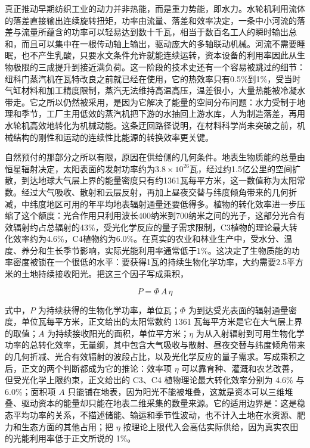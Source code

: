 真正推动早期纺织工业的动力并非热能，而是重力势能，即水力。水轮机利用流体的落差直接输出连续旋转扭矩，功率由流量、落差和效率决定，一条中小河流的落差与流量所蕴含的功率可以轻易达到数十千瓦，相当于数百名工人的瞬时输出总和，而且可以集中在一根传动轴上输出，驱动庞大的多轴联动机械。河流不需要睡眠，也不产生乳酸，只要水文条件允许就能连续运转，资本设备的利用率因此从生物极限的三成提升到接近满负荷。这一阶段的技术史还有一个容易被跳过的细节：纽科门蒸汽机在瓦特改良之前就已经在使用，它的热效率只有0.5\%到1\%，受当时气缸材料和加工精度限制，蒸汽无法维持高温高压，温差很小，大量热能被冷凝水带走。它之所以仍然被采用，是因为它解决了能量的空间分布问题：水力受制于地理和季节，工厂主用低效的蒸汽机把下游的水抽回上游水库，人为制造落差，再用水轮机高效地转化为机械动能。这条迂回路径说明，在材料科学尚未突破之前，机械结构的刚性和运动的连续性比能源的转换效率更关键。


自然预付的那部分之所以有限，原因在供给侧的几何条件。地表生物质能的总量由恒星辐射决定，太阳表面的发射功率约为$3.8\times10^{26}$瓦，经过约1.5亿公里的空间扩散，到达地球大气层上界的能量密度只有约1361瓦每平方米，这一数值称为太阳常数。\cite{prsa2016nominal}经过大气吸收、散射和云层反射，再加上昼夜交替与纬度倾角带来的几何折减，中纬度地区可用的年平均地表辐射通量还要低得多。植物的转化效率进一步压缩了这个额度：光合作用只利用波长400纳米到700纳米之间的光子，这部分光合有效辐射约占总辐射的43\%，受光化学反应的量子需求限制，C3植物的理论最大转化效率约为4.6\%，C4植物约为6.0\%。\cite{zhu2008what}在真实的农业和林业生产中，受水分、温度、养分和生长季节影响，实际光能利用率通常低于1\%。这决定了生物质能的功率密度被锁在一个很低的水平：要获得1瓦的持续生物化学功率，大约需要2.5平方米的土地持续接收阳光。\cite{smil2015power}把这三个因子写成乘积，

\begin{equation}
P=\Phi\,A\,\eta
\end{equation}

式中，$P$ 为持续获得的生物化学功率，单位瓦；$\Phi$ 为到达受光表面的辐射通量密度，单位瓦每平方米，正文给出的太阳常数约 1361 瓦每平方米是它在大气层上界的取值；$A$ 为持续接收阳光的面积，单位平方米；$\eta$ 为从入射辐射到可用生物化学功率的总转化效率，无量纲，其中包含大气吸收与散射、昼夜交替与纬度倾角带来的几何折减、光合有效辐射的波段占比，以及光化学反应的量子需求。写成乘积之后，正文的两个判断都成为它的推论：效率项 $\eta$ 可以靠育种、灌溉和农艺改善，但受光化学上限约束，正文给出的 C3、C4 植物理论最大转化效率分别为 4.6\% 与 6.0\%；面积项 $A$ 只能铺在地表，因为阳光不能被堆叠，这就是资本可以三维堆叠、驱动资本的能量却只能在地表二维采集的数量来源。它的适用边界是：这是稳态平均功率的关系，不描述储能、输运和季节性波动，也不计入土地在水资源、肥力和生态方面的其他占用；把 $\eta$ 按理论上限代入会高估实际供给，因为真实农田的光能利用率低于正文所说的 1\%。

